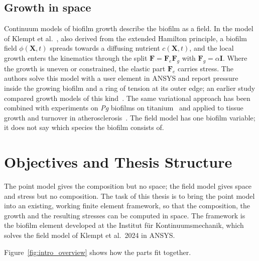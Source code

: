 \subsection{Growth in space}

Continuum models of biofilm growth describe the biofilm as a field.
In the model of Klempt et al.~\cite{Klempt2024DiffusionDrivenGrowth}, also derived from the extended Hamilton principle, a biofilm field $\phi(\mathbf X,t)$ spreads towards a diffusing nutrient $c(\mathbf X,t)$, and the local growth enters the kinematics through the split $\mathbf F=\mathbf F_e\mathbf F_g$ with $\mathbf F_g=\alpha\mathbf I$.
Where the growth is uneven or constrained, the elastic part $\mathbf F_e$ carries stress.
The authors solve this model with a user element in ANSYS and report pressure inside the growing biofilm and a ring of tension at its outer edge; an earlier study compared growth models of this kind~\cite{Klempt2023NumericalComparison}. The same variational approach has been combined with experiments on \textit{Pg} biofilms on titanium~\cite{Mukherjee2025PgTitanium} and applied to tissue growth and turnover in atherosclerosis~\cite{Soleimani2025Atherosclerosis}.
The field model has one biofilm variable; it does not say which species the biofilm consists of.

\section{Objectives and Thesis Structure}
\label{sec:intro_structure}

The point model gives the composition but no space; the field model gives space and stress but no composition.
The task of this thesis is to bring the point model into an existing, working finite element framework, so that the composition, the growth and the resulting stresses can be computed in space.
The framework is the biofilm element developed at the Institut für Kontinuumsmechanik, which solves the field model of Klempt et al.\ 2024 in ANSYS.

Figure~\ref{fig:intro_overview} shows how the parts fit together.

